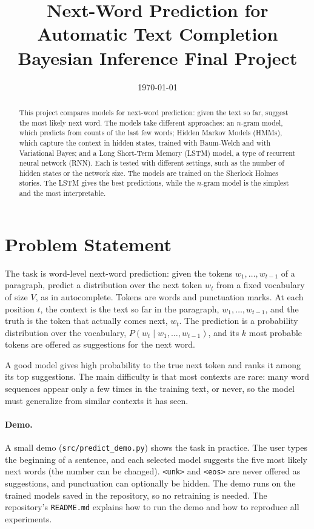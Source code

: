 \documentclass[11pt]{article}
\title{Next-Word Prediction for Automatic Text Completion\\ \Large Bayesian Inference Final Project}
\date{\today}
\begin{document}
\maketitle

\begin{abstract}
This project compares models for next-word prediction: given the text so far, suggest the most likely next word. The models take different
approaches: an $n$-gram model, which predicts from counts of the last few words; Hidden Markov Models (HMMs), which capture the context in hidden states, trained with Baum-Welch and with Variational Bayes; and a Long Short-Term Memory (LSTM) model, a type of recurrent neural network (RNN). Each is tested with different settings, such as the number of hidden states or the network size. The models are trained on the Sherlock Holmes stories. The LSTM gives the best predictions, while the $n$-gram model is the simplest and the most interpretable.
\end{abstract}



\tableofcontents

\section{Problem Statement}

The task is {word-level next-word prediction}: given the tokens
$w_1, \dots, w_{t-1}$ of a paragraph, predict a distribution over the
next token $w_t$ from a fixed vocabulary of size $V$, as in autocomplete.
Tokens are words and punctuation marks. At each position $t$, the
{context} is the text so far in the paragraph,
$w_1, \dots, w_{t-1}$, and the {truth} is the token that actually
comes next, $w_t$. The {prediction} is a probability distribution
over the vocabulary, $P(w_t \mid w_1, \dots, w_{t-1})$, and its $k$ most
probable tokens are offered as suggestions for the next word.

A good model gives high probability to the true next token and ranks it
among its top suggestions. The main difficulty is that most contexts are
rare: many word sequences appear only a few times in the training text,
or never, so the model must generalize from similar contexts it has seen.

\paragraph{Demo.} A small demo (\texttt{src/predict\_demo.py}) shows the
task in practice. The user types the beginning of a sentence, and each
selected model suggests the five most likely next words (the number can
be changed). \texttt{<unk>} and \texttt{<eos>} are never offered as suggestions, and punctuation can optionally be hidden. The demo runs on the trained models saved in the
repository, so no retraining is needed. The repository's
\texttt{README.md} explains how to run the demo and how to reproduce all
experiments.
\end{document}
